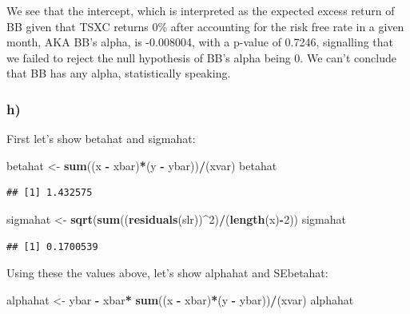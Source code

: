 \documentclass[
]{article}
\newenvironment{Shaded}{\begin{snugshade}}{\end{snugshade}}
\newcommand{\DecValTok}[1]{\textcolor[rgb]{0.00,0.00,0.81}{#1}}
\newcommand{\FunctionTok}[1]{\textcolor[rgb]{0.13,0.29,0.53}{\textbf{#1}}}
\newcommand{\NormalTok}[1]{#1}
\newcommand{\OtherTok}[1]{\textcolor[rgb]{0.56,0.35,0.01}{#1}}
\newcommand{\SpecialCharTok}[1]{\textcolor[rgb]{0.81,0.36,0.00}{\textbf{#1}}}
\begin{document}
We see that the intercept, which is interpreted as the expected excess
return of BB given that TSXC returns 0\% after accounting for the risk
free rate in a given month, AKA BB's alpha, is -0.008004, with a p-value
of 0.7246, signalling that we failed to reject the null hypothesis of
BB's alpha being 0. We can't conclude that BB has any alpha,
statistically speaking.

\subsubsection{h)}\label{h}

First let's show betahat and sigmahat:

\begin{Shaded}
\begin{Highlighting}[]
\NormalTok{betahat }\OtherTok{\textless{}{-}}  \FunctionTok{sum}\NormalTok{((x }\SpecialCharTok{{-}}\NormalTok{ xbar)}\SpecialCharTok{*}\NormalTok{(y }\SpecialCharTok{{-}}\NormalTok{ ybar))}\SpecialCharTok{/}\NormalTok{(xvar)}
\NormalTok{betahat}
\end{Highlighting}
\end{Shaded}

\begin{verbatim}
## [1] 1.432575
\end{verbatim}

\begin{Shaded}
\begin{Highlighting}[]
\NormalTok{sigmahat }\OtherTok{\textless{}{-}} \FunctionTok{sqrt}\NormalTok{(}\FunctionTok{sum}\NormalTok{((}\FunctionTok{residuals}\NormalTok{(slr))}\SpecialCharTok{\^{}}\DecValTok{2}\NormalTok{)}\SpecialCharTok{/}\NormalTok{(}\FunctionTok{length}\NormalTok{(x)}\SpecialCharTok{{-}}\DecValTok{2}\NormalTok{))}
\NormalTok{sigmahat}
\end{Highlighting}
\end{Shaded}

\begin{verbatim}
## [1] 0.1700539
\end{verbatim}

Using these the values above, let's show alphahat and SEbetahat:

\begin{Shaded}
\begin{Highlighting}[]
\NormalTok{alphahat }\OtherTok{\textless{}{-}}\NormalTok{ ybar }\SpecialCharTok{{-}}\NormalTok{ xbar}\SpecialCharTok{*} \FunctionTok{sum}\NormalTok{((x }\SpecialCharTok{{-}}\NormalTok{ xbar)}\SpecialCharTok{*}\NormalTok{(y }\SpecialCharTok{{-}}\NormalTok{ ybar))}\SpecialCharTok{/}\NormalTok{(xvar)}
\NormalTok{alphahat}
\end{Highlighting}
\end{Shaded}
\end{document}
